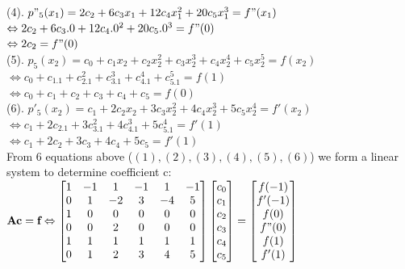 \documentclass[14pt,a4paper]{article}
\begin{document}
\begin{enumerate}
		(4). $p"_5(x_1) = 2c_2 + 6c_3x_1 + 12c_4x_1^2 + 20c_5x_1^3 = f"(x_1)$\\
		\hspace*{2.1cm} $ \Leftrightarrow 2c_2 + 6c_3.0 + 12c_4.0^2 + 20c_5.0^3 = f"(0)$\\
		\hspace*{2.1cm} $ \Leftrightarrow 2c_2 = f"(0)$ \\
		(5). $ p_5(x_2) = c_0 + c_1x_2 + c_2x_2^2 + c_3x_2^3 + c_4x_2^4 + c_5x_2^5 = f(x_2)$\\
		\hspace*{1.85cm} $ \Leftrightarrow c_0 + c_1.1 + c_2.1^2 + c_3.1^3 + c_4.1^4 + c_5.1^5 = f(1)$ \\
		\hspace*{1.85cm} $ \Leftrightarrow c_0 + c_1 + c_2 + c_3 + c_4 + c_5 = f(0)$ \\
		(6). $p'_5(x_2) = c_1 + 2c_2x_2 + 3c_3x_2^2 + 4c_4x_2^3 + 5c_5x_2^4 = f'(x_2)$\\
		\hspace*{1.85cm} $ \Leftrightarrow c_1 + 2c_2.1 + 3c_3.1^2 + 4c_4.1^3 + 5c_5.1^4 = f'(1)$ \\
		\hspace*{1.85cm} $ \Leftrightarrow c_1 + 2c_2 + 3c_3 + 4c_4 + 5c_5 = f'(1)$\\
		From 6 equations above ($(1), (2), (3), (4), (5), (6)$) we form a linear system to determine coefficient c:\\
		\hspace*{1cm} $ \textbf{Ac} = \textbf{f} \Leftrightarrow \begin{bmatrix} 1&-1&1&-1&1&-1 \\ 0&1&-2&3&-4&5 \\ 1&0&0&0&0&0 \\ 0&0&2&0&0&0 \\ 1&1&1&1&1&1 \\ 0&1&2&3&4&5	\end{bmatrix} \begin{bmatrix} c_0\\c_1\\c_2\\c_3\\c_4\\c_5 \end{bmatrix} = \begin{bmatrix} f(-1)\\ f'(-1) \\ f(0) \\ f"(0) \\f(1) \\ f'(1) \end{bmatrix} $ \\
	

\end{enumerate}
\end{document}
